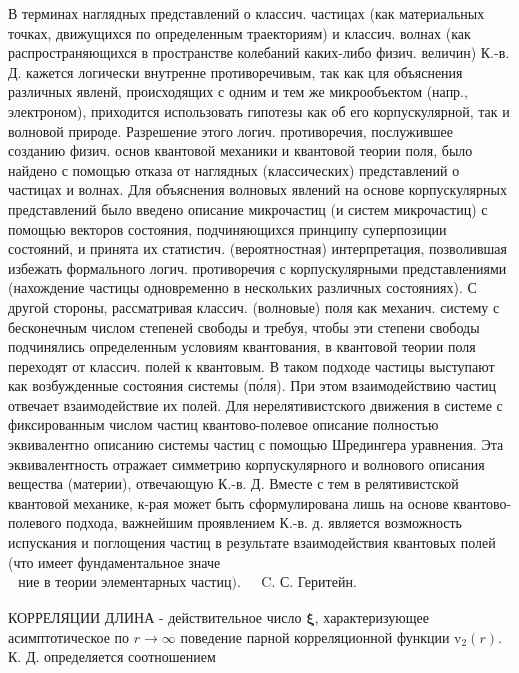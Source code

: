 \documentclass[10pt]{article}
\begin{document}
В терминах наглядных представлений о классич. частицах (как материальных точках, движущихся по определенным траекториям) и классич. волнах (как распространяющихся в пространстве колебаний каких-либо физич. величин) К.-в. Д. кажется логически внутренне противоречивым, так как цля объяснения различных явленй, происходящих с одним и тем же микрообъектом (напр., электроном), приходится использовать гипотезы как об его корпускулярной, так и волновой природе. Разрешение этого логич. противоречия, послужившее созданию физич. основ квантовой механики и квантовой теории поля, было найдено с помощью отказа от наглядных (классических) представлений о частицах и волнах. Для объяснения волновых явлений на основе корпускулярных представлений было введено описание микрочастиц (и систем микрочастиц) с помощью векторов состояния, подчиняющихся принципу суперпозиции состояний, и принята их статистич. (вероятностная) интерпретация, позволившая избежать формального логич. противоречия с корпускулярными представлениями (нахождение частицы одновременно в нескольких различных состояниях). С другой стороны, рассматривая классич. (волновые) поля как механич. систему с бесконечным числом степеней свободы и требуя, чтобы эти степени свободы подчинялись определенным условиям квантования, в квантовой теории поля переходят от классич. полей к квантовым. В таком подходе частицы выступают как возбужденные состояния системы (по́ля). При этом взаимодействию частиц отвечает взаимодействие их полей. Для нерелятивистского движения в системе с фиксированным числом частиц квантово-полевое описание полностью эквивалентно описанию системы частиц с помощью Шредингера уравнения. Эта эквивалентность отражает симметрию корпускулярного и волнового описания вещества (материи), отвечающую К.-в. Д. Вместе с тем в релятивистской квантовой механике, к-рая может быть сформулирована лишь на основе квантово-полевого подхода, важнейшим проявлением К.-в. д. является возможность испускания и поглощения частиц в результате взаимодействия квантовых полей (что имеет фундаментальное значе$\begin{array}{ll}\text { ние в теории элементарных частиц). } & \text { C. С. Геритейн. }\end{array}$



КОРРЕЛЯЦИИ ДЛИНА - действительное число $\boldsymbol{\xi}$, характеризующее асимптотическое по $r \rightarrow \infty$ поведение парной корреляционной функции $\mathrm{v}_{2}(r)$. К. Д. определяется соотношением
\end{document}

